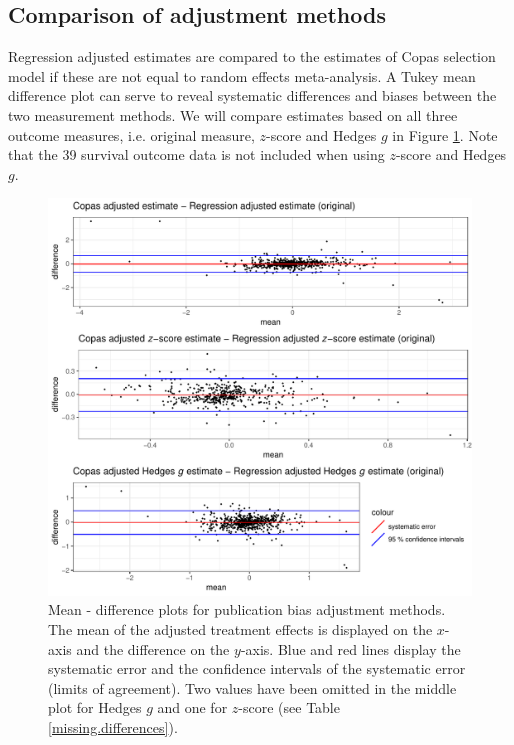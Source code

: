 \subsection{Comparison of adjustment methods}
Regression adjusted estimates are compared to the estimates of Copas selection model if these are not equal to random effects meta-analysis. A Tukey mean difference plot can serve to reveal systematic differences and biases between the two measurement methods. We will compare estimates based on all three outcome measures, i.e. original measure, $z$-score and Hedges $g$ in Figure \ref{fig:adjustment.mean.diff}. Note that the 39 survival outcome data is not included when using $z$-score and Hedges $g$.

\begin{figure}
\begin{knitrout}
\color{fgcolor}

{\centering \includegraphics[width=\textwidth-3cm]{figure/ch03_figunnamed-chunk-13-1} 

}



\end{knitrout}
\caption{Mean - difference plots for publication bias adjustment methods. The mean of the adjusted treatment effects is displayed on the $x$-axis and the difference on the $y$-axis. Blue and red lines display the systematic error and the confidence intervals of the systematic error (limits of agreement). Two values have been omitted in the middle plot for Hedges $g$ and one for $z$-score (see Table \ref{missing.differences}).}
\label{fig:adjustment.mean.diff}
\end{figure}

